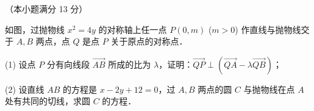 \begin{question}
（本小题满分 13 分）

如图，过抛物线 $x^2 = 4y$ 的对称轴上任一点 $P(0, m)$ ($m > 0$) 作直线与抛物线交于 $A, B$ 两点，点 $Q$ 是点 $P$ 关于原点的对称点．
\nopagebreak[4]
\begin{center}\end{center}
\nopagebreak[4]
(1) 设点 $P$ 分有向线段 $\vec{AB}$ 所成的比为 $\lambda$，证明：$\vec{QP} \perp (\vec{QA} - \lambda\vec{QB})$；

(2) 设直线 $AB$ 的方程是 $x - 2y + 12 = 0$，过 $A, B$ 两点的圆 $C$ 与抛物线在点 $A$ 处有共同的切线，求圆 $C$ 的方程．

\end{question}